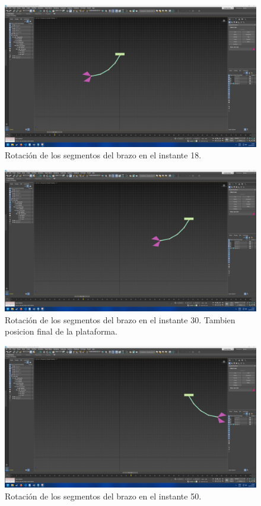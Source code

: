 \documentclass{article}
\begin{document}
\begin{figure}[H]
    \centering
    \includegraphics[width=\textwidth]{imagenes/Ejercicio4/keyframes/18.png}
    \caption{Rotación de los segmentos del brazo en el instante 18.}
\end{figure}

\begin{figure}[H]
    \centering
    \includegraphics[width=\textwidth]{imagenes/Ejercicio4/keyframes/30.png}
    \caption{Rotación de los segmentos del brazo en el instante 30. Tambien posicion final de la plataforma.}
\end{figure}

\begin{figure}[H]
    \centering
    \includegraphics[width=\textwidth]{imagenes/Ejercicio4/keyframes/50.png}
    \caption{Rotación de los segmentos del brazo en el instante 50.}
\end{figure}
\end{document}
